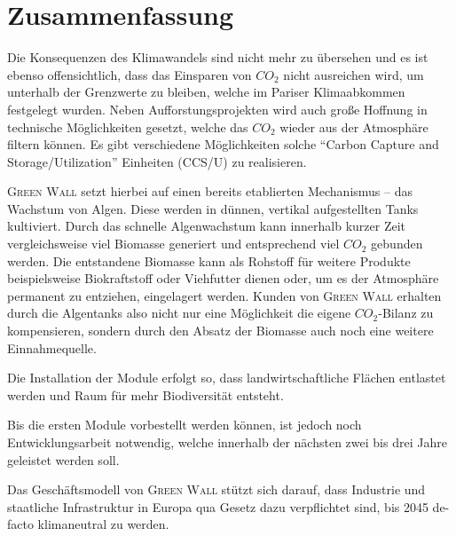\chapter{Zusammenfassung}

Die Konsequenzen des Klimawandels sind nicht mehr zu übersehen und es ist ebenso offensichtlich, dass das Einsparen von \(CO_2\) nicht ausreichen wird, um unterhalb der Grenzwerte zu bleiben, welche im Pariser Klimaabkommen festgelegt wurden. 
Neben Aufforstungsprojekten wird auch große Hoffnung in technische Möglichkeiten gesetzt, welche das \(CO_2\) wieder aus der Atmosphäre filtern können. 
Es gibt verschiedene Möglichkeiten solche ``Carbon Capture and Storage/Utilization'' Einheiten (CCS/U) zu realisieren.\par\medskip
%
\textsc{Green Wall} setzt hierbei auf einen bereits etablierten Mechanismus -- das Wachstum von Algen.
Diese werden in dünnen, vertikal aufgestellten Tanks kultiviert.
Durch das schnelle Algenwachstum kann innerhalb kurzer Zeit vergleichsweise viel Biomasse generiert und entsprechend viel \(CO_2\) gebunden werden.
Die entstandene Biomasse kann als Rohstoff für weitere Produkte beispielsweise Biokraftstoff oder Viehfutter dienen oder, um es der Atmosphäre permanent zu entziehen, eingelagert werden.
Kunden von \textsc{Green Wall} erhalten durch die Algentanks also nicht nur eine Möglichkeit die eigene \(CO_2\)-Bilanz zu kompensieren, sondern durch den Absatz der Biomasse auch noch eine weitere Einnahmequelle.

Die Installation der Module erfolgt so, dass landwirtschaftliche Flächen entlastet werden und Raum für mehr Biodiversität entsteht.

Bis die ersten Module vorbestellt werden können, ist jedoch noch Entwicklungsarbeit notwendig, welche innerhalb der nächsten zwei bis drei Jahre geleistet werden soll.

Das Geschäftsmodell von \textsc{Green Wall} stützt sich darauf, dass Industrie und staatliche Infrastruktur in Europa qua Gesetz dazu verpflichtet sind, bis 2045 de-facto klimaneutral zu werden.
